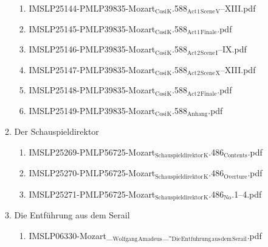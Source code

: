 \documentclass[11pt]{article}
\begin{document}
\begin{enumerate}
\begin{enumerate}
\begin{enumerate}
\item IMSLP25144-PMLP39835-Mozart$_{\text{Cosi}}$$_{\text{K}}$.588$_{\text{Act}}$$_{\text{1}}$$_{\text{Scene}}$$_{\text{V}}$--XIII.pdf
\label{sec-1-1-1-1-44-49-3-3-4}

\item IMSLP25145-PMLP39835-Mozart$_{\text{Cosi}}$$_{\text{K}}$.588$_{\text{Act}}$$_{\text{1}}$$_{\text{Finale}}$.pdf
\label{sec-1-1-1-1-44-49-3-3-5}

\item IMSLP25146-PMLP39835-Mozart$_{\text{Cosi}}$$_{\text{K}}$.588$_{\text{Act}}$$_{\text{2}}$$_{\text{Scene}}$$_{\text{I}}$--IX.pdf
\label{sec-1-1-1-1-44-49-3-3-6}

\item IMSLP25147-PMLP39835-Mozart$_{\text{Cosi}}$$_{\text{K}}$.588$_{\text{Act}}$$_{\text{2}}$$_{\text{Scene}}$$_{\text{X}}$--XIII.pdf
\label{sec-1-1-1-1-44-49-3-3-7}

\item IMSLP25148-PMLP39835-Mozart$_{\text{Cosi}}$$_{\text{K}}$.588$_{\text{Act}}$$_{\text{2}}$$_{\text{Finale}}$.pdf
\label{sec-1-1-1-1-44-49-3-3-8}

\item IMSLP25149-PMLP39835-Mozart$_{\text{Cosi}}$$_{\text{K}}$.588$_{\text{Anhang}}$.pdf
\label{sec-1-1-1-1-44-49-3-3-9}
\end{enumerate}

\item Der Schauspieldirektor
\label{sec-1-1-1-1-44-49-3-4}
\begin{enumerate}
\item IMSLP25269-PMLP56725-Mozart$_{\text{Schauspieldirektor}}$$_{\text{K}}$.486$_{\text{Contents}}$.pdf
\label{sec-1-1-1-1-44-49-3-4-1}

\item IMSLP25270-PMLP56725-Mozart$_{\text{Schauspieldirektor}}$$_{\text{K}}$.486$_{\text{Overture}}$.pdf
\label{sec-1-1-1-1-44-49-3-4-2}

\item IMSLP25271-PMLP56725-Mozart$_{\text{Schauspieldirektor}}$$_{\text{K}}$.486$_{\text{No}}$.1--4.pdf
\label{sec-1-1-1-1-44-49-3-4-3}
\end{enumerate}

\item Die Entführung aus dem Serail
\label{sec-1-1-1-1-44-49-3-5}
\begin{enumerate}
\item IMSLP06330-Mozart\_$_{\text{Wolfgang}}$$_{\text{Amadeus}}$\_-$_{\text{Die}}$$_{\text{Entfuhrung}}$$_{\text{aus}}$$_{\text{dem}}$$_{\text{Serail}}$.pdf
\label{sec-1-1-1-1-44-49-3-5-1}
\end{enumerate}


\end{enumerate}
\end{enumerate}
\end{document}
